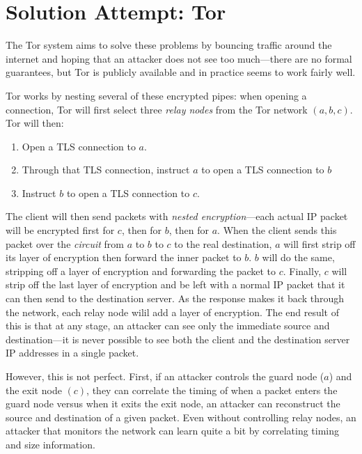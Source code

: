 \section{Solution Attempt: Tor}
The Tor system aims to solve these problems by
bouncing traffic around the internet and hoping
that an attacker does not see too much---there are
no formal guarantees, but Tor is publicly
available and in practice seems to work fairly
well.

Tor works by nesting several of these encrypted pipes: when opening a connection, Tor will first select three \emph{relay nodes} from the Tor network $(a, b, c)$. Tor will then:
\begin{enumerate}
	\item Open a TLS connection to $a$.
	\item Through that TLS connection, instruct $a$ to open a TLS connection to $b$
	\item Instruct $b$ to open a TLS connection to $c$.
\end{enumerate}

The client will then send packets with \emph{nested encryption}---each actual IP packet will be encrypted first for $c$, then for $b$, then for $a$. When the client sends this packet over the \emph{circuit} from $a$ to $b$ to $c$ to the real destination, $a$ will first strip off its layer of encryption then forward the inner packet to $b$. $b$ will do the same, stripping off a layer of encryption and forwarding the packet to $c$. Finally, $c$ will strip off the last layer of encryption and be left with a normal IP packet that it can then send to the destination server. As the response makes it back through the network, each relay node wilil add a layer of encryption. The end result of this is that at any stage, an attacker can see only the immediate source and destination---it is never possible to see both the client and the destination server IP addresses in a single packet.

However, this is not perfect. First, if an attacker controls the guard node ($a$) and the exit node $(c)$, they can correlate the timing of when a packet enters the guard node versus when it exits the exit node, an attacker can reconstruct the source and destination of a given packet. Even without controlling relay nodes, an attacker that monitors the network can learn quite a bit by correlating timing and size information.

